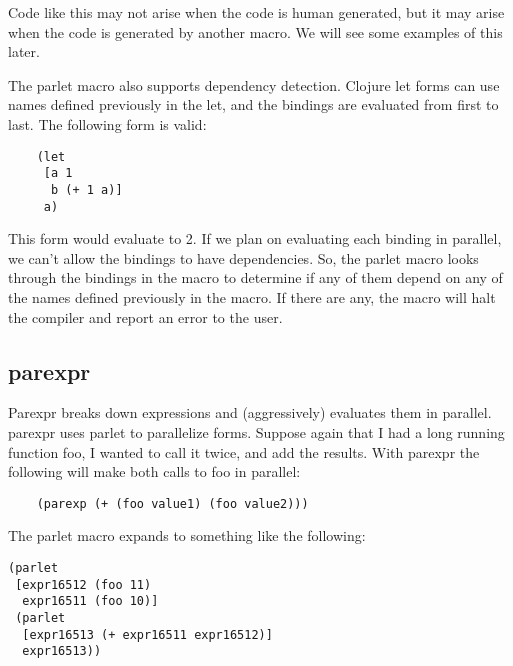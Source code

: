 \documentclass{article}
\begin{document}
Code like this may not arise when the code is human generated, but it may arise
when the code is generated by another macro. We will see some examples of this
later.

The parlet macro also supports dependency detection. Clojure let forms can use
names defined previously in the let, and the bindings are evaluated from first
to last. The following form is valid:

\begin{verbatim}
    (let
     [a 1
      b (+ 1 a)]
     a)
\end{verbatim}

This form would evaluate to 2. If we plan on evaluating each binding in
parallel, we can't allow the bindings to have dependencies. So, the parlet macro
looks through the bindings in the macro to determine if any of them depend on
any of the names defined previously in the macro. If there are any, the macro
will halt the compiler and report an error to the user.

\subsection{parexpr}

Parexpr breaks down expressions and (aggressively) evaluates them in parallel.
parexpr uses parlet to parallelize forms. Suppose again that I had a long
running function foo, I wanted to call it twice, and add the results. With
parexpr the following will make both calls to foo in parallel:

\begin{verbatim}
    (parexp (+ (foo value1) (foo value2)))
\end{verbatim}

The parlet macro expands to something like the following:

\begin{verbatim}
(parlet
 [expr16512 (foo 11)
  expr16511 (foo 10)]
 (parlet
  [expr16513 (+ expr16511 expr16512)]
  expr16513))
\end{verbatim}
\end{document}
